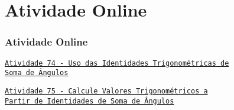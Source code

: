 \section{Atividade Online}
\begin{frame}
\frametitle{Atividade Online} 



\href{https://pt.khanacademy.org/math/trigonometry/trig-equations-and-identities/intro-to-trig-angle-addition-identities/e/trig_addition_identities}
{{\tt Atividade 74 - Uso das Identidades Trigonométricas de \\ Soma de Ângulos}}

\href{https://pt.khanacademy.org/math/trigonometry/trig-equations-and-identities/using-trig-identities/e/applying-angle-addition-formulas}
{{\tt Atividade 75 - Calcule Valores Trigonométricos a \\ Partir de Identidades de Soma de Ângulos}}




\end{frame}




